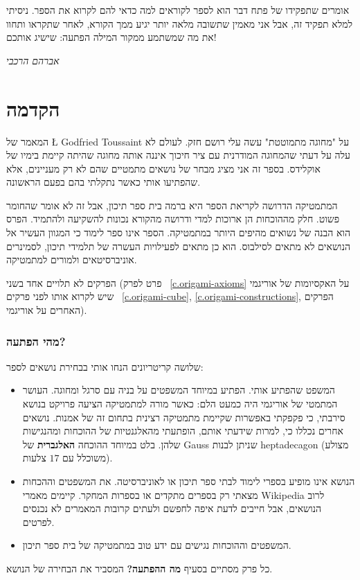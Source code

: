 אומרים שתפקידו של פתח דבר הוא לספר לקוראים למה כדאי להם לקרוא את הספר. ניסיתי למלא תפקיד זה, אבל אני מאמין שתשובה מלאה יותר יגיע ממך הקורא, לאחר שתקראו ותחוו את מה שמשתמע ממקור המילה הפתעה: שישיג אותכם!

\bigskip

\begin{flushleft}
\textit{אברהם הרכבי}
\end{flushleft}


\chapter*{הקדמה}
\thispagestyle{empty}

המאמר של 
\L{\cite{toussaint} Godfried Toussaint}
על "מחוגה מתמוטטת" עשה עלי רושם חזק. לעולם לא עלה על דעתי שהמחוגה המודרנית עם ציר חיכוך איננה אותה מחוגה שהיתה קיימת בימיו של אוקלידס. 
בספר זה אני מציג מבחר של נושאים מתמטיים שהם לא רק מעניינים, אלא שהפתיעו אותי כאשר נתקלתי בהם בפעם הראשונה. 

המתמטיקה הדרושה לקריאת הספר היא ברמה בית ספר תיכון, אבל זה לא אומר שהחומר פשוט. חלק מההוכחות הן ארוכות למדי ודרושה מהקורא נכונות להשקיעה ולהתמיד. הפרס הוא הבנה של נשואים מהיפים היותר במתמטיקה. הספר אינו ספר לימוד כי המגוון העשיר אל הנושאים לא מתאים לסילבוס. הוא כן מתאים לפעילויות העשרה של תלמידי תיכון, לסמינרים אוניברסיטאים ולמורים למתמטיקה.


הפרקים לא תלויים אחד בשני (פרט לפרק~%
\ref{c.origami-axioms}
על האקסיומות של אוריגמי שיש לקרוא אותו לפני פרקים~%
\ref{c.origami-cube}, \ref{c.origami-constructions},
הפרקים האחרים על אוריגמי).

\subsection*{מהי הפתעה?}

שלושה קריטריונים הנחו אותי בבחירת נושאים לספר:
\begin{itemize}
\item 
המשפט שהפתיע אותי. הפתיע במיוחד המשפטים על בניה עם סרגל ומחוגה. העושר המתמטי של אוריגמי היה כמעט הלם: כאשר מורה למתמטיקה הציעה פרויקט בנושא סירבתי, כי פקפקתי באפשרות שקיימת מתמטיקה רצינית בתחום זה של אמנות. נושאים אחרים נכללו כי, למרות שידעתי אותם, הופתעתי מהאלגנטיות של ההוכחות ומהנגישות שלהן. בלט במיוחד ההוכחה 
\textbf{האלגברית}
של Gauss שניתן לבנות heptadecagon (מצולע משוכלל עם $17$ צלעות).

\item
הנושא אינו מופיע בספרי לימוד לבתי ספר תיכון או לאוניברסיטה. את המשפטים וההכחות מצאתי רק בספרים מתקדים או בספרות המחקר. קיימים מאמרי Wikipedia לרוב הנושאים, אבל חייבים לדעת איפה לחפשם ולעתים קרובות המאמרים לא נכנסים לפרטים.

\item
המשפטים וההוכחות נגישים עם ידע טוב במתמטיקה של בית ספר תיכון.
\end{itemize}
כל פרק מסתיים בסעיף 
\textbf{מה ההפתעה?}
המסביר את הבחירה של הנושא.


